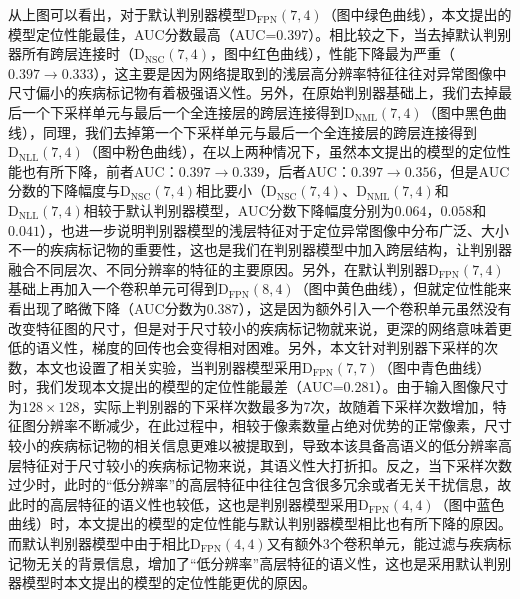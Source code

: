 从上图可以看出，对于默认判别器模型$\mathrm{D}_\mathrm{FPN}(7,4)$（图中绿色曲线），本文提出的模型定位性能最佳，AUC分数最高（AUC=$0.397$）。相比较之下，当去掉默认判别器所有跨层连接时（$\mathrm{D}_\mathrm{NSC}(7,4)$，图中红色曲线），性能下降最为严重（$0.397\rightarrow 0.333$），这主要是因为网络提取到的浅层高分辨率特征往往对异常图像中尺寸偏小的疾病标记物有着极强语义性。另外，在原始判别器基础上，我们去掉最后一个下采样单元与最后一个全连接层的跨层连接得到$\mathrm{D}_\mathrm{NML}(7,4)$（图中黑色曲线），同理，我们去掉第一个下采样单元与最后一个全连接层的跨层连接得到$\mathrm{D}_\mathrm{NLL}(7,4)$（图中粉色曲线），在以上两种情况下，虽然本文提出的模型的定位性能也有所下降，前者AUC：$0.397\rightarrow 0.339$，后者AUC：$0.397\rightarrow 0.356$，但是AUC分数的下降幅度与$\mathrm{D}_\mathrm{NSC}(7,4)$相比要小（$\mathrm{D}_\mathrm{NSC}(7,4)$、$\mathrm{D}_\mathrm{NML}(7,4)$和$\mathrm{D}_\mathrm{NLL}(7,4)$相较于默认判别器模型，AUC分数下降幅度分别为$0.064$，$0.058$和$0.041$），也进一步说明判别器模型的浅层特征对于定位异常图像中分布广泛、大小不一的疾病标记物的重要性，这也是我们在判别器模型中加入跨层结构，让判别器融合不同层次、不同分辨率的特征的主要原因。另外，在默认判别器$\mathrm{D}_\mathrm{FPN}(7,4)$基础上再加入一个卷积单元可得到$\mathrm{D}_\mathrm{FPN}(8,4)$（图中黄色曲线），但就定位性能来看出现了略微下降（AUC分数为$0.387$），这是因为额外引入一个卷积单元虽然没有改变特征图的尺寸，但是对于尺寸较小的疾病标记物就来说，更深的网络意味着更低的语义性，梯度的回传也会变得相对困难。另外，本文针对判别器下采样的次数，本文也设置了相关实验，当判别器模型采用$\mathrm{D}_\mathrm{FPN}(7,7)$（图中青色曲线）时，我们发现本文提出的模型的定位性能最差（AUC=$0.281$）。由于输入图像尺寸为$128\times 128$，实际上判别器的下采样次数最多为$7$次，故随着下采样次数增加，特征图分辨率不断减少，在此过程中，相较于像素数量占绝对优势的正常像素，尺寸较小的疾病标记物的相关信息更难以被提取到，导致本该具备高语义的低分辨率高层特征对于尺寸较小的疾病标记物来说，其语义性大打折扣。反之，当下采样次数过少时，此时的“低分辨率”的高层特征中往往包含很多冗余或者无关干扰信息，故此时的高层特征的语义性也较低，这也是判别器模型采用$\mathrm{D}_\mathrm{FPN}(4,4)$（图中蓝色曲线）时，本文提出的模型的定位性能与默认判别器模型相比也有所下降的原因。而默认判别器模型中由于相比$\mathrm{D}_\mathrm{FPN}(4,4)$又有额外$3$个卷积单元，能过滤与疾病标记物无关的背景信息，增加了“低分辨率”高层特征的语义性，这也是采用默认判别器模型时本文提出的模型的定位性能更优的原因。
